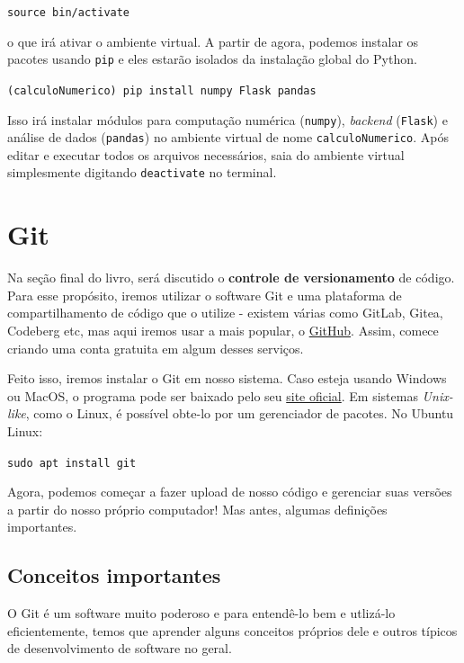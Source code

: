 \documentclass{article}
\begin{document}
	\vspace{1ex}
	\texttt{source bin/activate}
	\vspace{1ex} 

	o que irá ativar o ambiente virtual. A partir de agora, podemos instalar os pacotes usando \texttt{pip} e eles estarão
	isolados da instalação global do Python. 

	\vspace{1ex} 
	\texttt{(calculoNumerico) pip install numpy Flask pandas} 
	\vspace{1ex} 

	Isso irá instalar módulos para computação numérica (\texttt{numpy}), \textit{backend} (\texttt{Flask}) e
	análise de dados (\texttt{pandas}) no ambiente virtual de nome \texttt{calculoNumerico}. Após editar e executar todos
	os arquivos necessários, saia do ambiente virtual simplesmente digitando \texttt{deactivate} no terminal. 

	\section{Git} 

	Na seção final do livro, será discutido o \textbf{controle de versionamento} de código. Para esse propósito, iremos utilizar 
	o software Git e uma plataforma de compartilhamento de código que o utilize - existem várias como GitLab, Gitea, Codeberg etc, mas
	aqui iremos usar a mais popular, o \href{https://github.com/}{GitHub}. Assim, comece criando uma conta gratuita em algum desses serviços.

	Feito isso, iremos instalar o Git em nosso sistema. Caso esteja usando Windows ou MacOS, o programa pode ser baixado 
	pelo seu \href{https://git-scm.com/}{site oficial}. Em sistemas \textit{Unix-like}, como o Linux, é possível obte-lo por um 
	gerenciador de pacotes. No Ubuntu Linux: 

	\vspace{1ex}
	\texttt{sudo apt install git}
	\vspace{1ex}

	Agora, podemos começar a fazer upload de nosso código e gerenciar suas versões a partir do nosso próprio computador! Mas antes,
	algumas definições importantes. 

	\subsection{Conceitos importantes}

	O Git é um software muito poderoso e para entendê-lo bem e utlizá-lo eficientemente, temos que aprender alguns conceitos 
	próprios dele e outros típicos de desenvolvimento de software no geral. 
\end{document}
